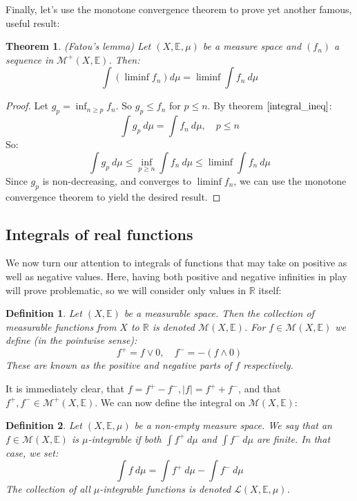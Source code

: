 \documentclass[12pt, a4paper]{article}
\newtheorem{theorem}{Theorem}[section]
\newtheorem{definition}{Definition}[section]
\numberwithin{equation}{section}
\begin{document}
Finally, let's use the monotone convergence theorem to prove yet another famous, useful result:

\begin{theorem}
\label{fatou}
(Fatou's lemma) Let $(X,\mathbb{E},\mu)$ be a measure space and $(f_n)$ a sequence in $\mathcal{M}^+(X,\mathbb{E})$. Then:
\begin{equation}
\int(\liminf f_n)d\mu=\liminf\int f_n\ d\mu
\end{equation} 
\end{theorem}
\begin{proof}
Let $g_p=\inf_{n\ge p}f_n$. So $g_p\le f_n$ for $p\le n$. By theorem $\ref{integral_ineq}$:
\begin{equation}
\int g_p\ d\mu=\int f_n\ d\mu,\quad p\le n
\end{equation}
So:
\begin{equation}
\int g_p\ d\mu\le\inf_{p\ge n}\int f_n\ d\mu\le\liminf\int f_n\ d\mu
\end{equation}
Since $g_p$ is non-decreasing, and converges to $\liminf f_n$, we can use the monotone convergence theorem to yield the desired result.
\end{proof}

\subsection{Integrals of real functions}
We now turn our attention to integrals of functions that may take on positive as well as negative values. Here, having both positive and negative infinities in play will prove problematic, so we will consider only values in $\mathbb{R}$ itself:

\begin{definition}
Let $(X,\mathbb{E})$ be a measurable space. Then the collection of measurable functions from $X$ to $\mathbb{R}$ is denoted $\mathcal{M}(X,\mathbb{E})$. For $f\in\mathcal{M}(X,\mathbb{E})$ we define (in the pointwise sense):
\begin{equation}
f^+=f\vee 0,\quad f^-=-(f \wedge 0)
\end{equation}
These are known as the positive and negative parts of $f$ respectively.
\end{definition}

It is immediately clear, that $f=f^+ -f^-, |f|=f^+ +f^-$, and that $f^+,f^-\in\mathcal{M}^+(X,\mathbb{E})$. We can now define the integral on $\mathcal{M}(X,\mathbb{E})$:

\begin{definition}
Let $(X,\mathbb{E},\mu)$ be a non-empty measure space. We say that an $f\in\mathcal{M}(X,\mathbb{E})$ is $\mu$-integrable if both $\int f^+\ d\mu$ and $\int f^-\ d\mu$ are finite. In that case, we set:
\begin{equation}
\label{non-negative_integral}
\int f\ d\mu=\int f^+\ d\mu - \int f^-\ d\mu
\end{equation}
The collection of all $\mu$-integrable functions is denoted $\mathcal{L}(X,\mathbb{E},\mu)$.
\end{definition}
\end{document}
